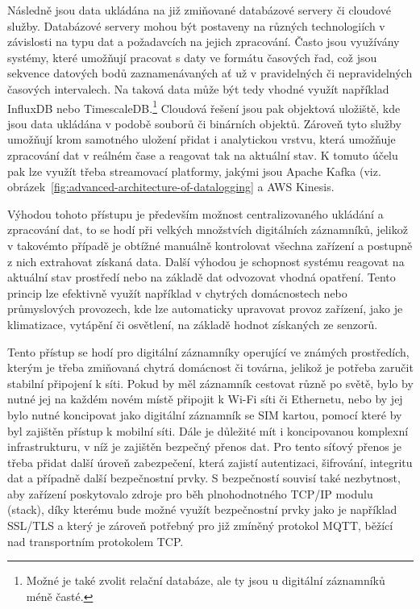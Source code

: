 
Následně jsou data ukládána na již zmiňované databázové servery či cloudové služby. Databázové servery mohou být postaveny na různých technologiích v závislosti na typu dat a požadavcích na jejich zpracování. Často jsou využívány systémy, které umožňují pracovat s daty ve formátu časových řad, což jsou sekvence datových bodů zaznamenávaných ať už v pravidelných či nepravidelných časových intervalech. Na taková data může být tedy vhodné využít například InfluxDB nebo TimescaleDB.\footnote{Možné je také zvolit relační databáze, ale ty jsou u digitální záznamníků méně časté.} Cloudová řešení jsou pak objektová uložiště, kde jsou data ukládána v podobě souborů či binárních objektů. Zároveň tyto služby umožňují krom samotného uložení přidat i analytickou vrstvu, která umožňuje zpracování dat v reálném čase a reagovat tak na aktuální stav. K tomuto účelu pak lze využít třeba streamovací platformy, jakými jsou Apache Kafka (viz. obrázek~\ref{fig:advanced-architecture-of-datalogging} a AWS Kinesis. \cite{springer_analysis_time_series_db_edge_computing}

Výhodou tohoto přístupu je především možnost centralizovaného ukládání a zpracování dat, to se hodí při velkých množstvích digitálních záznamníků, jelikož v takovémto případě je obtížné manuálně kontrolovat všechna zařízení a postupně z nich extrahovat získaná data. Další výhodou je schopnost systému reagovat na aktuální stav prostředí nebo na základě dat odvozovat vhodná opatření. Tento princip lze efektivně využít například v chytrých domácnostech nebo průmyslových provozech, kde lze automaticky upravovat provoz zařízení, jako je klimatizace, vytápění či osvětlení, na základě hodnot získaných ze senzorů. \cite{springer_analysis_time_series_db_edge_computing}

Tento přístup se hodí pro digitální záznamníky operující ve známých prostředích, kterým je třeba zmiňovaná chytrá domácnost či továrna, jelikož je potřeba zaručit stabilní připojení k síti. Pokud by měl záznamník cestovat různě po světě, bylo by nutné jej na každém novém místě připojit k Wi-Fi síti či Ethernetu, nebo by jej bylo nutné koncipovat jako digitální záznamník se SIM kartou, pomocí které by byl zajištěn přístup k mobilní síti. Dále je důležité mít i koncipovanou komplexní infrastrukturu, v níž je zajištěn bezpečný přenos dat. Pro tento síťový přenos je třeba přidat další úroveň zabezpečení, která zajistí autentizaci, šifrování, integritu dat a případně další bezpečnostní prvky. S bezpečností souvisí také nezbytnost, aby zařízení poskytovalo zdroje pro běh plnohodnotného TCP/IP modulu
(stack), díky kterému bude možné využít bezpečnostní prvky jako je například SSL/TLS a který je zároveň potřebný pro již zmíněný protokol MQTT, běžící nad transportním protokolem TCP.


